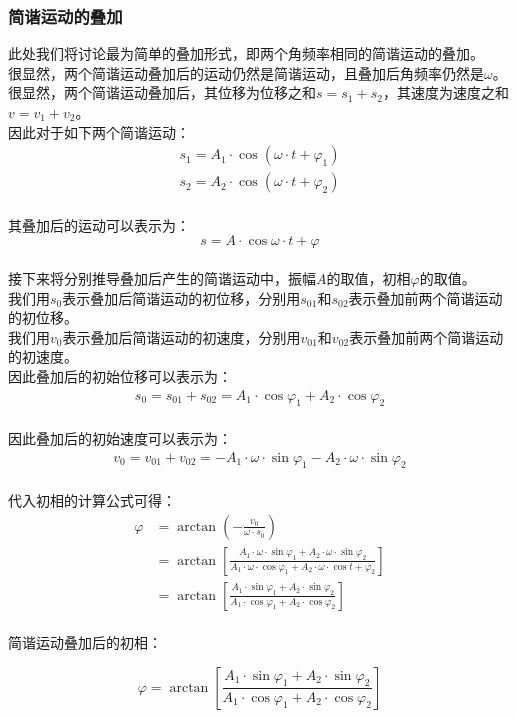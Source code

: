 \documentclass[UTF8]{ctexart}
\begin{document}
\subsubsection{简谐运动的叠加}
    此处我们将讨论最为简单的叠加形式，即两个角频率相同的简谐运动的叠加。\\[3mm]
    很显然，两个简谐运动叠加后的运动仍然是简谐运动，且叠加后角频率仍然是$\omega$。\\[3mm]
    很显然，两个简谐运动叠加后，其位移为位移之和$s=s_1+s_2$，其速度为速度之和$v=v_1+v_2$。\\[5mm]
    因此对于如下两个简谐运动：
    \setcounter{equation}{0}
    \begin{align}
        s_1=A_1\cdot\cos{\left(\omega\cdot t+\varphi_1\right)}\\[3mm]
        s_2=A_2\cdot\cos{\left(\omega\cdot t+\varphi_2\right)}
    \end{align}\\
    其叠加后的运动可以表示为：
    \begin{equation}
        s=A\cdot\cos{\omega\cdot t+\varphi}
    \end{equation}\\
    接下来将分别推导叠加后产生的简谐运动中，振幅$A$的取值，初相$\varphi$的取值。\\[3mm]
    我们用$s_0$表示叠加后简谐运动的初位移，分别用$s_{01}$和$s_{02}$表示叠加前两个简谐运动的初位移。\\[3mm]
    我们用$v_0$表示叠加后简谐运动的初速度，分别用$v_{01}$和$v_{02}$表示叠加前两个简谐运动的初速度。\\[6mm]
    因此叠加后的初始位移可以表示为：
    \begin{align}
        s_0=s_{01}+s_{02}=A_1\cdot\cos{\varphi_1}+A_2\cdot\cos{\varphi_2}
    \end{align}\\
    因此叠加后的初始速度可以表示为：
    \begin{align}
        v_0=v_{01}+v_{02}=-A_1\cdot\omega\cdot\sin{\varphi_1}-A_2\cdot\omega\cdot\sin{\varphi_2}
    \end{align}\\
    代入初相的计算公式可得：
    \begin{align}
        \varphi
        &=\arctan{\left(-\frac{v_0}{\omega\cdot s_0}\right)}\\[3mm]
        &=\arctan{\left[\frac{A_1\cdot\omega\cdot\sin{\varphi_1}+A_2\cdot\omega\cdot\sin{\varphi_2}}{A_1\cdot\omega\cdot\cos{\varphi_1}+A_2\cdot\omega\cdot\cos{t+\varphi_2}}\right]}\\[3mm]
        &=\arctan{\left[\frac{A_1\cdot\sin{\varphi_1}+A_2\cdot\sin{\varphi_2}}{A_1\cdot\cos{\varphi_1}+A_2\cdot\cos{\varphi_2}}\right]}
    \end{align}\\
    简谐运动叠加后的初相：
    \begin{large}
        \begin{equation*}
            \varphi=\arctan{\left[\frac{A_1\cdot\sin{\varphi_1}+A_2\cdot\sin{\varphi_2}}{A_1\cdot\cos{\varphi_1}+A_2\cdot\cos{\varphi_2}}\right]}
        \end{equation*}
    \end{large}
    
\end{document}
